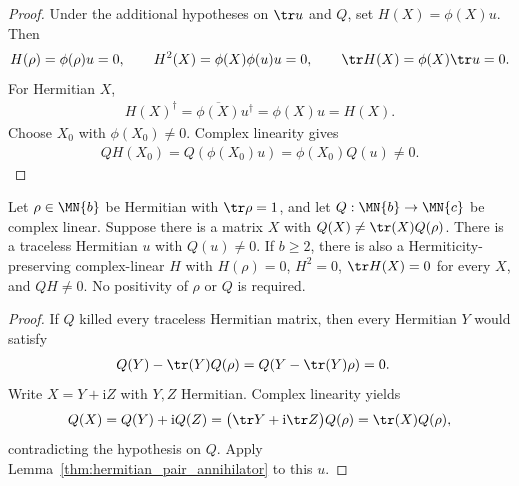 \begin{proof}
    Under the additional hypotheses on $\tr u$ and $Q$, set
    $H(X)=\phi(X)u$. Then
    \begin{align}
        H(\rho)=\phi(\rho)u=0,\qquad
        H^2(X)=\phi(X)\phi(u)u=0,\qquad
        \tr H(X)=\phi(X)\tr u=0.
        \label{eq:hermitian_pair_nilpotent_identities}
    \end{align}
    For Hermitian $X$,
    \begin{align}
        H(X)^\dagger=\overline{\phi(X)}u^\dagger
        =\phi(X)u=H(X).
        \label{eq:hermitian_pair_hermitian_output}
    \end{align}
    Choose $X_0$ with $\phi(X_0)\ne0$. Complex linearity gives
    \begin{align}
        QH(X_0)=Q(\phi(X_0)u)=\phi(X_0)Q(u)\ne0.
        \label{eq:hermitian_pair_nonzero_composition}
    \end{align}
\end{proof}

\begin{lemma}
    \label{lem:nilpotent_non_trace_preparation}
    \leanok
    Let $\rho\in \MN{b}$ be Hermitian with $\tr\rho=1$, and let
    $Q:\MN{b}\to \MN{c}$ be complex linear. Suppose there is a matrix $X$ with
    $Q(X)\ne\tr(X)Q(\rho)$.
    There is a traceless Hermitian $u$ with $Q(u)\ne0$.
    If $b\ge2$, there is also a Hermiticity-preserving complex-linear $H$
    with $H(\rho)=0$, $H^2=0$, $\tr H(X)=0$ for every $X$,
    and $QH\ne0$. No positivity of $\rho$ or $Q$ is required.
\end{lemma}

\begin{proof}
    \leanok
    If $Q$ killed every traceless Hermitian matrix, then every Hermitian
    $Y$ would satisfy
    \begin{align}
        Q(Y)-\tr(Y)Q(\rho)
        &= Q(Y-\tr(Y)\rho)=0.
        \label{eq:trace_preparation_hermitian_reduction}
    \end{align}
    Write $X=Y+\mathrm{i}Z$ with $Y,Z$ Hermitian. Complex linearity yields
    \begin{align}
        Q(X)=Q(Y)+\mathrm{i}Q(Z)
        =\bigl(\tr Y+\mathrm{i}\tr Z\bigr)Q(\rho)
        =\tr(X)Q(\rho),
        \label{eq:trace_preparation_complexification}
    \end{align}
    contradicting the hypothesis on $Q$.
    Apply Lemma~\ref{thm:hermitian_pair_annihilator} to this $u$.
\end{proof}


